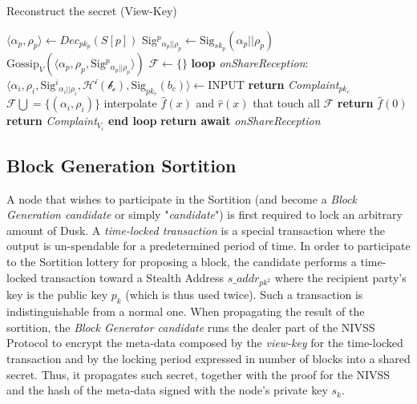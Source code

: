     \begin{algorithm}
        \caption{Reconstruct the secret (View-Key)}
        \begin{algorithmic}[1]
                \State $\langle\alpha_p, \rho_p\rangle \leftarrow Dec_{pk_p}(S[p])$
                \State Sig${^p}_{\alpha_p||\rho_p} \leftarrow \textrm{Sig}_{sk_p}(\alpha_p||\rho_p)$
                \State $\textrm{Gossip}_V(\langle\alpha_p, \rho_p, \textrm{Sig}{^p}_{\alpha_p||\rho_p}\rangle)$ 
                \State $\mathcal{F} \leftarrow \{\}$ 
                \BState \textbf{loop} \emph{onShareReception}:
                \State $\langle\alpha_i, \rho_i, \textrm{Sig}{^i}_{\alpha_i||\rho_i}, \mathcal{H^i(b_c)}, \textrm{Sig}_{pk_c}(b_c)\rangle \leftarrow \textrm{INPUT}$
                 
                	\State \textbf{return} \textit{Complaint}$_{pk_c}$ 
                    \State $\mathcal{F} \bigcup = \{(\alpha_i, \rho_i)\}$
                    	\State interpolate $\hat{f}(x)$ and $\hat{r}(x)$ that touch all $\mathcal{F}$ 
                        \State \textbf{return }$\hat{f}(0)$
                    \EndIf
                \Else
                	\State \textbf{return} \textit{Complaint}$_{V_i}$
                \EndIf
                \BState \textbf{end loop}
                \State \textbf{return await} \emph{onShareReception}                
            \EndProcedure
        \end{algorithmic}
    \end{algorithm}


\subsection{Block Generation Sortition}

A node that wishes to participate in the Sortition (and become a \textit{Block Generation candidate} or simply "\textit{candidate}") is first required to lock an arbitrary amount of \textrm{Dusk}. A \textit{time-locked transaction} is a special transaction where the output is un-spendable for a predetermined period of time. In order to participate to the Sortition lottery for proposing a block, the candidate performs a time-locked transaction toward a Stealth Address $s\_addr_{pk^2}$ where the recipient party's key is the public key $p_k$ (which is thus used twice). Such a transaction is indistinguishable from a normal one. When propagating the result of the sortition, the \textit{Block Generator candidate} runs the dealer part of the NIVSS Protocol to encrypt the meta-data composed by the \textit{view-key} for the time-locked transaction and by the locking period expressed in number of blocks into a shared secret. Thus, it propagates such secret, together with the proof for the NIVSS and the hash of the meta-data signed with the node's private key $s_k$. 

